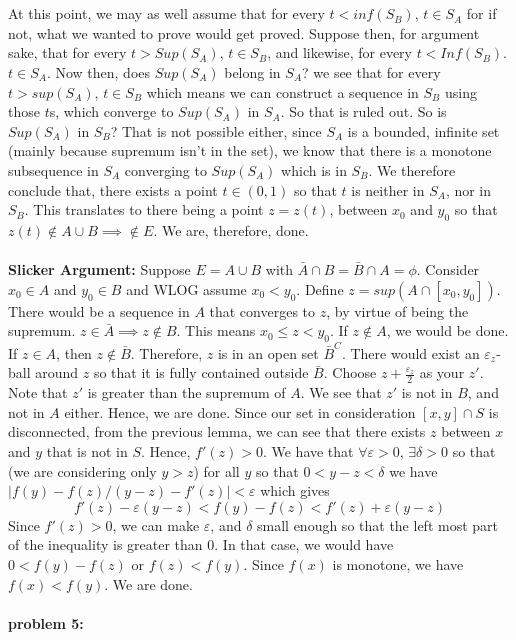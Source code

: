 \documentclass[../Main.tex]{subfiles}
\begin{document}
{\\\\ At this point, we may as well assume that for every $t<inf(S_B)$, $t \in S_A$ for if not, what we wanted to prove would get proved. 
Suppose then, for argument sake, that for every $t>Sup(S_A)$, $t\in S_B$, and
likewise, for every $t<Inf(S_B)$. $t \in S_A$. Now then, does $Sup(S_A)$ belong
in $S_A$? we see that for every $t>sup(S_A)$, $t \in S_B$ which means we can construct a sequence in $S_B$ using those $t$s, which converge to $Sup(S_A)$ in $S_A$. So that is ruled out.
So is $Sup(S_A)$ in $S_B$? That is not possible either, since $S_A$ is a bounded, infinite set (mainly because supremum isn't in the set), we know that there is a monotone subsequence in $S_A$ converging to $Sup(S_A)$ which is in $S_B$. We therefore conclude that, there exists a point $t \in (0,1)$ so that $t$ is neither in $S_A$, nor in $S_B$. This translates to there being a point $z=z(t)$, between $x_0$ and $y_0$ so that $z(t)\not\in A \cup B \implies \not\in E$. We are, therefore, done. 
\\\\ \textbf{Slicker Argument:} Suppose $E=A \cup B$ with $\bar{A}\cap B=\bar{B} \cap A=\phi$. Consider $x_0 \in A$ and $y_0 \in B$ and WLOG assume $x_0<y_0$. Define $z=sup(A\cap[x_0,y_0])$.
There would be a sequence in $A$ that converges to $z$, by virtue of being the supremum. $z \in \bar{A} \implies z \not\in B$. This means $x_0 \leq z<y_0$. If $z \not\in A$, we would be done.
If $z \in A$, then $z \not\in \bar{B}$. Therefore, $z$ is in an open set $\bar{B}^C$. There would exist
an $\varepsilon_z$-ball around $z$ so that it is fully contained outside $\bar{B}$. Choose $z+\frac{\varepsilon_z}{2}$ as your $z'$.
Note that $z'$ is greater than the supremum of $A$. We see that $z'$ is not in $B$, and not in $A$ either. Hence, we are done.
}
Since our set in consideration $[x,y]\cap S$ is disconnected, from the previous lemma, we can see that there exists $z$ between $x$ and $y$ that is not in $S$. Hence, $f'(z)>0$. We have that $\forall \varepsilon>0$, $\exists \delta>0$ so that (we are considering only $y>z$) for all $y$ so that $0<y-z<\delta$ we have $|f(y)-f(z)/(y-z)-f'(z)|<\varepsilon$ which gives $$f'(z)-\varepsilon(y-z)<f(y)-f(z)<f'(z)+\varepsilon(y-z) $$ Since $f'(z)>0$, we can make $\varepsilon$, and $\delta$ small enough so that the left most part of the inequality is greater than $0$. In that case, we would have $0<f(y)-f(z)$ or $f(z)<f(y)$. Since $f(x)$ is monotone, we have $f(x)<f(y)$. We are done.
\\\\ \textbf{problem 5:}
\end{document}

